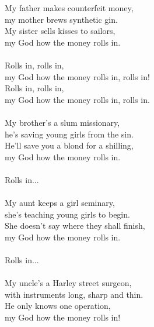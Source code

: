 
            My father makes counterfeit money, \\
            my mother brews synthetic gin. \\
            My sister sells kisses to sailors, \\
            my God how the money rolls in. \\
\hspace{10mm} \\
            Rolls in, rolls in, \\
            my God how the money rolls in, rolls in! \\
            Rolls in, rolls in, \\
            my God how the money rolls in, rolls in. \\
\hspace{10mm} \\
            My brother’s a slum missionary, \\
            he’s saving young girls from the sin. \\
            He’ll save you a blond for a shilling, \\
            my God how the money rolls in. \\
\hspace{10mm} \\
            Rolls in... \\
\hspace{10mm} \\
            My aunt keeps a girl seminary, \\
            she’s teaching young girls to begin. \\
            She doesn’t say where they shall finish, \\
            my God how the money rolls in. \\
\hspace{10mm} \\
            Rolls in... \\
\hspace{10mm} \\
            My uncle’s a Harley street surgeon, \\
            with instruments long, sharp and thin. \\
            He only knows one operation, \\
            my God how the money rolls in! \\
